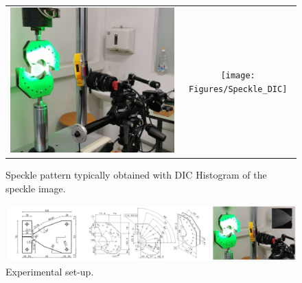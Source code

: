 \documentclass[3p,times,procedia]{elsarticle}
\begin{document}
\begin{figure}[htbp]
	\centering
	\begin{tabular}{cc}
		\begin{minipage}{0.3\textwidth}
			\centering
			\includegraphics[width=\textwidth]{Figures/Setup0_crop}
			\caption{Experimental set-up.}
			\label{fig:Setup0°}
		\end{minipage} &
		\begin{minipage}{0.3\textwidth}
			\centering
			\texttt{[image: Figures/Speckle\_DIC]}
			\caption{Speckle pattern typically obtained with DIC Histogram of the speckle image.}
			\label{fig:Speckle_DIC}
		\end{minipage}
	\end{tabular}
\end{figure}

\begin{figure}[htbp]
	\centering
	\includegraphics[width=\textwidth]{Fig1}
	\begin{minipage}{0.3\textwidth}
	\hspace{1cm}\hspace{1cm}
	\end{minipage}
	\caption{Experimental set-up.}
	\label{F:Fig1}
\end{figure}
\end{document}
